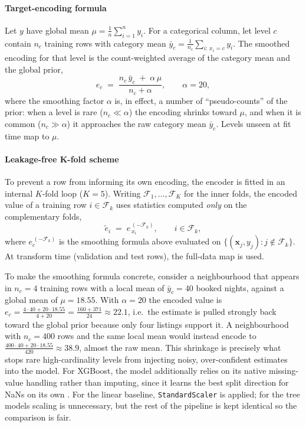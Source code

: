\documentclass[journal]{IEEEtran}
\begin{document}
\paragraph{Target-encoding formula} Let $y$ have global mean
$\mu=\tfrac{1}{n}\sum_{i=1}^{n}y_i$. For a categorical column, let level $c$
contain $n_c$ training rows with category mean
$\bar y_c=\tfrac{1}{n_c}\sum_{i:\,x_i=c}y_i$. The smoothed encoding for that
level is the count-weighted average of the category mean and the global prior,
\begin{equation}
e_c \;=\; \frac{n_c\,\bar y_c \;+\; \alpha\,\mu}{\,n_c+\alpha\,},
\qquad \alpha = 20,
\label{eq:smooth}
\end{equation}
where the smoothing factor $\alpha$ is, in effect, a number of ``pseudo-counts''
of the prior: when a level is rare ($n_c\!\ll\!\alpha$) the encoding shrinks
toward $\mu$, and when it is common ($n_c\!\gg\!\alpha$) it approaches the raw
category mean $\bar y_c$. Levels unseen at fit time map to $\mu$.

\paragraph{Leakage-free K-fold scheme} To prevent a row from informing its own
encoding, the encoder is fitted in an internal $K$-fold loop ($K=5$). Writing
$\mathcal{F}_1,\dots,\mathcal{F}_K$ for the inner folds, the encoded value of a
training row $i\in\mathcal{F}_k$ uses statistics computed \emph{only} on the
complementary folds,
\begin{equation}
\tilde e_i \;=\; e^{\,(-\mathcal{F}_k)}_{\,x_i},
\qquad i\in\mathcal{F}_k,
\label{eq:kfoldte}
\end{equation}
where $e^{\,(-\mathcal{F}_k)}_{c}$ is the smoothing formula above evaluated on
$\{(\mathbf{x}_j,y_j):j\notin\mathcal{F}_k\}$. At transform time (validation and
test rows), the full-data map is used.

To make the smoothing formula concrete, consider a neighbourhood that appears in
$n_c=4$ training rows with a local mean of $\bar y_c=40$ booked nights, against a
global mean of $\mu=18.55$. With $\alpha=20$ the encoded value is
$e_c=\frac{4\cdot 40+20\cdot 18.55}{4+20}=\frac{160+371}{24}\approx 22.1$, i.e.\
the estimate is pulled strongly back toward the global prior because only four
listings support it. A neighbourhood with $n_c=400$ rows and the same local mean
would instead encode to $\frac{400\cdot40+20\cdot18.55}{420}\approx 38.9$, almost
the raw mean. This shrinkage is precisely what stops rare high-cardinality levels
from injecting noisy, over-confident estimates into the model. For XGBoost, the model additionally relies on its
native missing-value handling rather than imputing, since it learns the best
split direction for NaNs on its own \cite{chen2016xgboost}. For the linear
baseline, \texttt{StandardScaler} is applied; for the tree models scaling is
unnecessary, but the rest of the pipeline is kept identical so the comparison is
fair.
\end{document}
